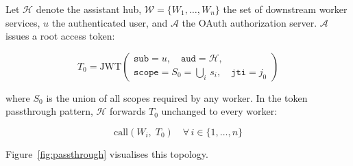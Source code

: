 \documentclass[journal]{IEEEtran}
\begin{document}
Let $\mathcal{H}$ denote the assistant hub, $\mathcal{W}=\{W_1,\ldots,W_n\}$ the
set of downstream worker services, $u$ the authenticated user, and $\mathcal{A}$
the OAuth authorization server. $\mathcal{A}$ issues a root access token:

\begin{equation}
T_0 = \mathrm{JWT}\!\left(\begin{array}{l}
  \texttt{sub} = u,\quad \texttt{aud} = \mathcal{H},\\[2pt]
  \texttt{scope} = S_0 = \textstyle\bigcup_{i}\, s_i,\quad
  \texttt{jti} = j_0
\end{array}\right)
\label{eq:root}
\end{equation}

where $S_0$ is the union of all scopes required by any worker. In the token
passthrough pattern, $\mathcal{H}$ forwards $T_0$ unchanged to every worker:

\begin{equation}
\mathrm{call}(W_i,\; T_0) \quad \forall\, i \in \{1, \ldots, n\}
\label{eq:passthrough}
\end{equation}

Figure~\ref{fig:passthrough} visualises this topology.
\end{document}
